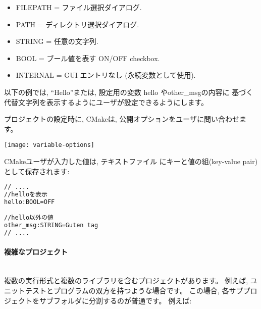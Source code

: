 \documentclass[uplatex,11pt,a4paper,landscape,dvipdfmx]{jsarticle} %
\newcommand{\sectiontitle}[1]{\paragraph{#1} \ \\} %
\begin{document}
\begin{multicols}{2}
\begin{itemize}  
\item FILEPATH = ファイル選択ダイアログ.
\item PATH     = ディレクトリ選択ダイアログ.
\item STRING   = 任意の文字列.
\item BOOL     = ブール値を表す ON/OFF checkbox.
\item INTERNAL = GUI エントリなし (永続変数として使用).
\end{itemize}

以下の例では, ``Hello''または, 設定用の変数 hello やother\_msgの内容に
基づく代替文字列を表示するようにユーザが設定できるようにします。


プロジェクトの設定時に, CMakeは, 公開オプションをユーザに問い合わせま
す。

\texttt{[image: variable-options]}

CMakeユーザが入力した値は, テキストファイル 
にキーと値の組(key-value pair)として保存されます:
\begin{lstlisting}[language=bash]
// ....
//helloを表示
hello:BOOL=OFF

//hello以外の値
other_msg:STRING=Guten tag
// ....
\end{lstlisting}

\sectiontitle{複雑なプロジェクト}

複数の実行形式と複数のライブラリを含むプロジェクトがあります。
例えば, ユニットテストとプログラムの双方を持つような場合です。
この場合, 各サブプロジェクトをサブフォルダに分割するのが普通です。
例えば: 
\vspace{\baselineskip} %
\noindent{}


\end{multicols}
\end{document}
